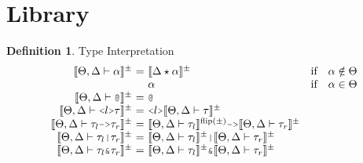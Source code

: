 \documentclass[acmsmall]{acmart}
\theoremstyle{definition}
\newtheorem{definition}{Definition}[section]
\begin{document}



\section{Library}
\label{sec:library}

\begin{definition} 
  \label{def:type_interpretation}
  Type Interpretation 
  \hfill
  \\
  \[
  \begin{array}[t]{r@{}c@{}lcl}
      \llbracket \Theta, \Delta \entails \alpha \rrbracket^\pm 
      &\ =\ & 
      \llbracket \Delta \star  \alpha \rrbracket^\pm
      &\text{if}& 
      \alpha \notin \Theta

      \\

      &&
      \alpha
      &\text{if}&
      \alpha \in \Theta

      \\

      \llbracket \Theta, \Delta \entails \J{@} \rrbracket^\pm 
      &\ =\ & 
      \J{@}
      &&

      \\

      \llbracket \Theta, \Delta \entails \J{<}l\J{>}\tau \rrbracket^\pm
      &\ =\ & 
      \J{<}l\J{>}\llbracket \Theta, \Delta \entails \tau \rrbracket^\pm

      \\

      \llbracket \Theta, \Delta \entails \tau_l\J{->}\tau_r \rrbracket^\pm 
      &\ =\ & 
      \llbracket \Theta, \Delta \entails \tau_l \rrbracket^{\text{flip}(\pm)}
      \J{->}
      \llbracket \Theta, \Delta \entails \tau_r \rrbracket^\pm

      \\

      \llbracket \Theta, \Delta \entails \tau_l\J{|}\tau_r \rrbracket^\pm
      &\ =\ & 
      \llbracket \Theta, \Delta \entails \tau_l \rrbracket^\pm
      \J{|}
      \llbracket \Theta, \Delta \entails \tau_r \rrbracket^{\pm}

      \\

      \llbracket \Theta, \Delta \entails \tau_l\J{\&}\tau_r \rrbracket^\pm 
      &\ =\ & 
      \llbracket \Theta, \Delta \entails \tau_l \rrbracket^\pm
      \J{\&}
      \llbracket \Theta, \Delta \entails \tau_r \rrbracket^{\pm}


\end{array}\]
\end{definition}
\end{document}

